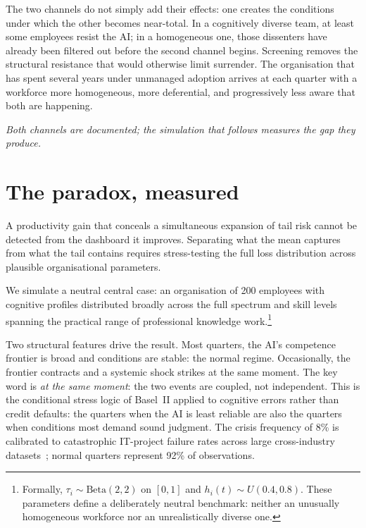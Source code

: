 \documentclass[11pt,a4paper]{article}
\newcommand{\bridgeskip}{\vspace{6pt}}
\begin{document}
The two channels do not simply add their effects: one creates the
conditions under which the other becomes near-total. In a cognitively
diverse team, at least some employees resist the AI; in a homogeneous
one, those dissenters have already been filtered out before the second
channel begins. Screening removes the structural resistance that would
otherwise limit surrender. The organisation that has spent several
years under unmanaged adoption arrives at each quarter with a workforce
more homogeneous, more deferential, and progressively less aware that
both are happening.

\bridgeskip
\noindent\emph{Both channels are documented; the simulation that
follows measures the gap they produce.}

\section{The paradox, measured}

A productivity gain that conceals a simultaneous expansion of tail risk
cannot be detected from the dashboard it improves. Separating what the mean
captures from what the tail contains requires stress-testing the full loss
distribution across plausible organisational parameters.

We simulate a neutral central case: an organisation of 200 employees with
cognitive profiles distributed broadly across the full spectrum and skill
levels spanning the practical range of professional knowledge
work.\footnote{Formally, $\tau_i \sim \mathrm{Beta}(2,2)$ on $[0,1]$ and
$h_i(t) \sim U(0.4, 0.8)$. These parameters define a deliberately neutral
benchmark: neither an unusually homogeneous workforce nor an unrealistically
diverse one.}

Two structural features drive the result.
Most quarters, the AI's competence frontier is broad and conditions are
stable: the normal regime.
Occasionally, the frontier contracts and a systemic shock strikes at the
same moment. The key word is \emph{at the same moment}: the two events are
coupled, not independent. This is the conditional stress logic of Basel~II
applied to cognitive errors rather than credit defaults: the quarters when
the AI is least reliable are also the quarters when conditions most demand
sound judgment. The crisis frequency of 8\% is calibrated to catastrophic
IT-project failure rates across large cross-industry
datasets~\cite{flyvbjerg_jmis_2022,flyvbjerg_pmj_2025}; normal quarters
represent 92\% of observations.
\end{document}
